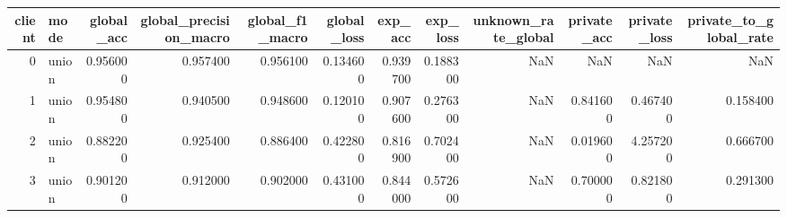 \begin{tabular}{rlrrrrrrrrrr}
\toprule
client & mode & global_acc & global_precision_macro & global_f1_macro & global_loss & exp_acc & exp_loss & unknown_rate_global & private_acc & private_loss & private_to_global_rate \\
\midrule
0 & union & 0.956000 & 0.957400 & 0.956100 & 0.134600 & 0.939700 & 0.188300 & NaN & NaN & NaN & NaN \\
1 & union & 0.954800 & 0.940500 & 0.948600 & 0.120100 & 0.907600 & 0.276300 & NaN & 0.841600 & 0.467400 & 0.158400 \\
2 & union & 0.882200 & 0.925400 & 0.886400 & 0.422800 & 0.816900 & 0.702400 & NaN & 0.019600 & 4.257200 & 0.666700 \\
3 & union & 0.901200 & 0.912000 & 0.902000 & 0.431000 & 0.844000 & 0.572600 & NaN & 0.700000 & 0.821800 & 0.291300 \\
\bottomrule
\end{tabular}
